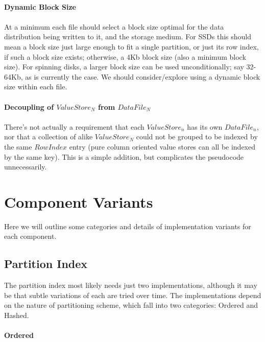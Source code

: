 \documentclass[fleqn]{article}
\begin{document}
\paragraph{Dynamic Block Size}
\paragraph{}
    At a minimum each file should select a block size optimal for the data distribution being written to it, 
    and the storage medium. For SSDs this should mean a block size just large enough to fit a single partition, 
    or just its row index, if such a block size exists; otherwise, a 4Kb block size (also a minimum block size).
    For spinning disks, a larger block size can be used unconditionally; say 32-64Kb, as is currently the case.
    We should consider/explore using a dynamic block size within each file.
\paragraph{Decoupling of $ValueStore_N$ from $DataFile_N$}
\paragraph{}
    There's not actually a requirement that each $ValueStore_n$ has its own $DataFile_n$, nor that a collection
    of alike $ValueStore_N$ could not be grouped to be indexed by the same $RowIndex$ entry (pure column oriented
    value stores can all be indexed by the same key). This is a simple addition, but complicates the pseudocode
    unnecessarily.

\clearpage
\section{Component Variants}
Here we will outline some categories and details of implementation variants for each component.

\subsection{Partition Index}
The partition index most likely needs just two implementations, although it may be that subtle variations
of each are tried over time. The implementations depend on the nature of partitioning scheme, which
fall into two categories: Ordered and Hashed.
\paragraph{Ordered}
\end{document}
